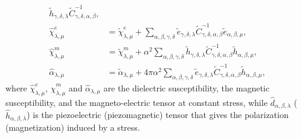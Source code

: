 \documentclass[12pt,a4paper,twoside]{report}
\begin{document}
{\begin{align}
\tilde h_{\gamma,\delta,\lambda} 
\tilde C^{-1}_{\gamma,\delta,\alpha,\beta}, \\
\hat \chi^e_{\lambda,\mu}&= \tilde \chi^e_{\lambda,\mu}
+ 
\sum_{\alpha,\beta,\gamma,\delta}\tilde e_{\gamma,\delta,\lambda}
\tilde C^{-1}_{\gamma,\delta,\alpha,\beta} \tilde e_{\alpha,\beta,\mu}, \\
\hat \chi^m_{\lambda,\mu}&= \tilde \chi^m_{\lambda,\mu}
+\alpha^2 \sum_{\alpha,\beta,\gamma,\delta}\tilde h_{\gamma,\delta,\lambda}
\tilde C^{-1}_{\gamma,\delta,\alpha,\beta} \tilde h_{\alpha,\beta,\mu}, \\
\hat \alpha_{\lambda,\mu}&= \tilde \alpha_{\lambda,\mu}
+4 \pi \alpha^2 
\sum_{\alpha,\beta,\gamma,\delta}\tilde e_{\gamma,\delta,\lambda}
\tilde C^{-1}_{\gamma,\delta,\alpha,\beta} \tilde h_{\alpha,\beta,\mu},
\end{align}
where $\hat \chi^e_{\lambda,\mu}$, $\hat \chi^m_{\lambda,\mu}$ and
$\hat \alpha_{\lambda,\mu}$ are the dielectric susceptibility, the magnetic
susceptibility, 
and the magneto-electric tensor at constant stress, while 
$\hat d_{\alpha,\beta,\lambda}$ ($\hat h_{\alpha,\beta,\lambda}$)
is the piezoelectric (piezomagnetic) tensor that
gives the polarization (magnetization) induced by a stress. 

}
\end{document}
